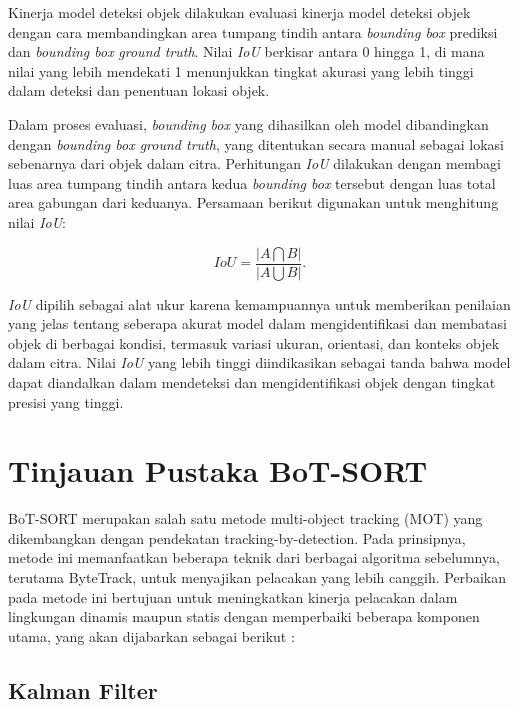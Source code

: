 Kinerja model deteksi objek dilakukan evaluasi kinerja model deteksi objek dengan cara membandingkan area tumpang tindih antara \emph{bounding box} prediksi dan \emph{bounding box} \emph{ground truth}. Nilai \emph{IoU} berkisar antara 0 hingga 1, di mana nilai yang lebih mendekati 1 menunjukkan tingkat akurasi yang lebih tinggi dalam deteksi dan penentuan lokasi objek.

Dalam proses evaluasi, \emph{bounding box} yang dihasilkan oleh model dibandingkan dengan \emph{bounding box ground truth}, yang ditentukan secara manual sebagai lokasi sebenarnya dari objek dalam citra. Perhitungan \emph{IoU} dilakukan dengan membagi luas area tumpang tindih antara kedua \emph{bounding box} tersebut dengan luas total area gabungan dari keduanya. Persamaan berikut digunakan untuk menghitung nilai \emph{IoU}: 

\begin{equation}
  IoU = \frac{\left |A\bigcap B  \right |}{\left | A\bigcup B \right |}.
\end{equation}

\emph{IoU} dipilih sebagai alat ukur karena kemampuannya untuk memberikan penilaian yang jelas tentang seberapa akurat model dalam mengidentifikasi dan membatasi objek di berbagai kondisi, termasuk variasi ukuran, orientasi, dan konteks objek dalam citra. Nilai \emph{IoU} yang lebih tinggi diindikasikan sebagai tanda bahwa model dapat diandalkan dalam mendeteksi dan mengidentifikasi objek dengan tingkat presisi yang tinggi.

\section{Tinjauan Pustaka BoT-SORT}

BoT-SORT merupakan salah satu metode multi-object tracking (MOT) yang dikembangkan dengan pendekatan tracking-by-detection. Pada prinsipnya, metode ini memanfaatkan beberapa teknik dari berbagai algoritma sebelumnya, terutama ByteTrack, untuk menyajikan pelacakan yang lebih canggih. Perbaikan pada metode ini bertujuan untuk meningkatkan kinerja pelacakan dalam lingkungan dinamis maupun statis dengan memperbaiki beberapa komponen utama, yang akan dijabarkan sebagai berikut \parencite{aharon2022botsortrobustassociationsmultipedestrian}:

\subsection{Kalman Filter}

